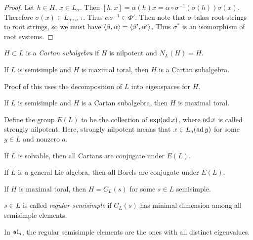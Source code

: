 \documentclass[twoside, 10pt]{article}
\begin{document}
    \begin{proof}
        Let $h \in H$, $x \in L_{\alpha}$. Then $[h,x] = \alpha(h)x = \alpha \circ \sigma^{-1}(\sigma(h)) \sigma(x)$. Therefore $\sigma(x) \in L_{\alpha \circ \sigma^{-1}}$. Thus $\alpha \sigma^{-1} \in \Phi'$. Then note that $\sigma$ takes root strings to root strings, so we must have $\langle\beta, \alpha\rangle = \langle\beta',\alpha'\rangle$. Thus $\sigma^*$ is an isomorphism of root systems.
    \end{proof}

    \begin{defn}
        $H \subset L$ is a \textit{Cartan subalgebra} if $H$ is nilpotent and $N_L(H) = H$.
    \end{defn}

    \begin{prop}
        If $L$ is semisimple and $H$ is maximal toral, then $H$ is a Cartan subalgebra.
    \end{prop}

    Proof of this uses the decomposition of $L$ into eigenspaces for $H$.

    \begin{thm}
        If $L$ is semisimple and $H$ is a Cartan subalgebra, then $H$ is maximal toral.
    \end{thm}

    Define the group $E(L)$ to be the collection of $\exp(\operatorname{ad} x)$, where $\operatorname{ad} x$ is called strongly nilpotent. Here, strongly nilpotent means that $x \in L_a(\operatorname{ad} y)$ for some $y \in L$ and nonzero $a$.

    \begin{thm}
        If $L$ is solvable, then all Cartans are conjugate under $E(L)$.
    \end{thm}

    \begin{thm}
        If $L$ is a general Lie algebra, then all Borels are conjugate under $E(L)$.
    \end{thm}

    \begin{cor}
        If $H$ is maximal toral, then $H = C_L(s)$ for some $s \in L$ semisimple.
    \end{cor}

    \begin{defn}
        $s \in L$ is called \textit{regular semisimple} if $C_L(s)$ has minimal dimension among all semisimple elements.
    \end{defn}

    \begin{exm}
        In $\mathfrak{sl}_n$, the regular semisimple elements are the ones with all distinct eigenvalues.
    \end{exm}
\end{document}
